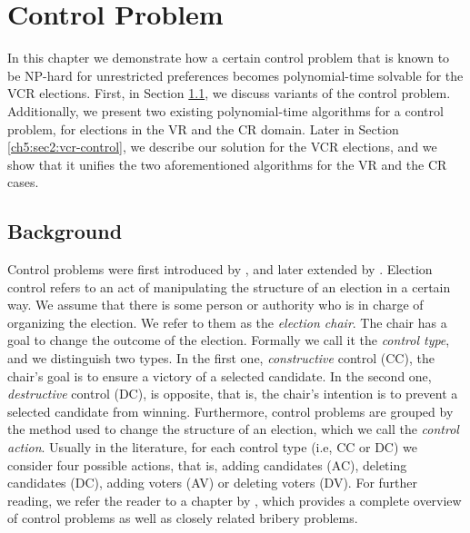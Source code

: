 
\chapter{Control Problem}\label{ch:control}

\ifpdf
    \graphicspath{{Chapter5/Figs/Raster/}{Chapter5/Figs/PDF/}{Chapter5/Figs/}}
\else
    \graphicspath{{Chapter5/Figs/Vector/}{Chapter5/Figs/}}
\fi



In this chapter we demonstrate how a certain control problem that is known to be 
NP-hard for unrestricted preferences becomes polynomial-time solvable for the VCR elections.
First, in Section \ref{ch5:sec1:overview}, we discuss variants of the control problem. 
Additionally, we present two existing polynomial-time algorithms for a control problem, for elections in the VR and the CR domain.
Later in Section \ref{ch5:sec2:vcr-control}, we describe our solution for the VCR elections,
and we show that it unifies the two aforementioned algorithms for the VR and the CR cases.

\section{Background}\label{ch5:sec1:overview}
Control problems were first introduced by \cite{bartholdi-control}, and later extended by \cite{hemaspaandra-control}.
Election control refers to an act of manipulating the structure of an election in a certain way.
We assume that there is some person or authority who is in charge of organizing the election.
We refer to them as the \textit{election chair}.
The chair has a goal to change the outcome of the election.
Formally we call it the \textit{control type},
and we distinguish two types. In the first one, \textit{constructive} control (CC), 
the chair's goal is to ensure a victory of a selected candidate.
In the second one, \textit{destructive} control (DC), is opposite,
that is, the chair's intention is to prevent a selected candidate from winning.
Furthermore, control problems are grouped by the method used to change the structure of an election, which we call the \textit{control action}.
Usually in the literature, for each control type (i.e, CC or DC) we consider four possible actions, that is,
adding candidates (AC), deleting candidates (DC), adding voters (AV) or deleting voters (DV).
For further reading, we refer the reader to a chapter by \cite{control-hcsc-faliszewski},
which provides a complete overview of control problems as well as closely related bribery problems.

